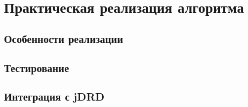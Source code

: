 \chapter{Практическая реализация алгоритма}


\FloatBarrier
\section{Особенности реализации}

\FloatBarrier
\section{Тестирование}

\FloatBarrier
\section{Интеграция с jDRD}

\FloatBarrier

